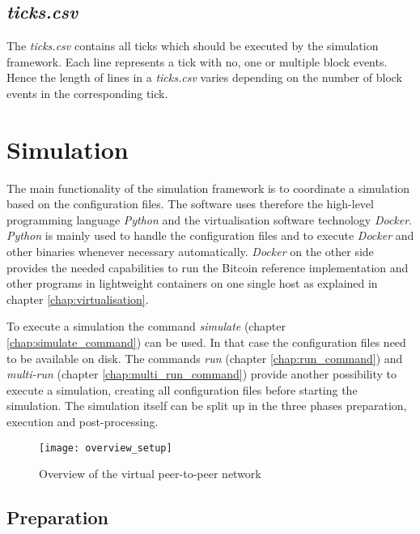 \subsection{\textit{ticks.csv}}

The \textit{ticks.csv} contains all ticks which should be executed by the simulation framework.
Each line represents a tick with no, one or multiple block events.
Hence the length of lines in a \textit{ticks.csv} varies depending on the number of block events in the corresponding tick.

\section{Simulation}
\label{chap:simulation}

The main functionality of the simulation framework is to coordinate a simulation based on the configuration files.
The software uses therefore the high-level programming language \textit{Python} and the virtualisation software technology \textit{Docker}.
\textit{Python} is mainly used to handle the configuration files and to execute \textit{Docker} and other binaries whenever necessary automatically.
\textit{Docker} on the other side provides the needed capabilities to run the Bitcoin reference implementation and other programs in lightweight containers on one single host as explained in chapter \ref{chap:virtualisation}.
	
To execute a simulation the command \textit{simulate} (chapter \ref{chap:simulate_command}) can be used.
In that case the configuration files need to be available on disk.
The commands \textit{run} (chapter \ref{chap:run_command}) and \textit{multi-run} (chapter \ref{chap:multi_run_command}) provide another possibility to execute a simulation, creating all configuration files before starting the simulation.
The simulation itself can be split up in the three phases preparation, execution and post-processing.

\begin{figure}[t]
\texttt{[image: overview\_setup]}
\centering
\caption{Overview of the virtual peer-to-peer network}
\label{fig:overview}
\end{figure}

\subsection{Preparation}

